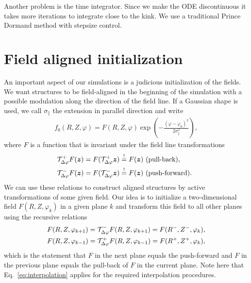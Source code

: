 Another problem is the time integrator. Since we make the ODE
discontinuous it takes more iterations to integrate close to the kink.
We use a traditional Prince Dormand method with stepsize control.
\section{Field aligned initialization} \label{sec:parallelc}

An important aspect of our simulations is a judicious initialization of the
fields. We want structures to be field-aligned in the beginning of the simulation with
a possible modulation along the direction of the field line.
If a Gaussian shape is used, we call $\sigma_\parallel$ the extension in parallel
direction and write
\begin{align}
    f_0(R,Z,\varphi) = F(R,Z,\varphi) \exp\left( - \frac{(\varphi-\varphi_0)^2}{2\sigma_\parallel^2}\right),
    \label{eq:parallelInit}
\end{align}
where $F$ is a function that is invariant under the field line transformations
\begin{subequations}
\begin{align}
    \mathcal T^+_{\Delta\varphi} F({\boldsymbol{z}}) &= F( \mathcal T^+_{\Delta\varphi} {\boldsymbol{z}}) \overset{!}{=} F({\boldsymbol{z}}) \text{ (pull-back), } \\
    \mathcal T^-_{\Delta\varphi} F({\boldsymbol{z}}) &= F( \mathcal T^-_{\Delta\varphi} {\boldsymbol{z}}) \overset{!}{=} F({\boldsymbol{z}}) \text{ (push-forward). } 
\end{align}
\label{}
\end{subequations}
We can use these relations to construct aligned structures
by active transformations of some given field.
Our idea is to initialize a two-dimensional field $F(R,Z, \varphi_k)$ in a given plane $k$ and
transform this field to all other planes using the recursive relations
\begin{subequations}
\begin{align}
    F( R, Z, \varphi_{k+1}) = \mathcal T^-_{\Delta\varphi} F( R, Z, \varphi_{k+1}) = F(R^-, Z^-, \varphi_k), \\
    F( R, Z, \varphi_{k-1}) = \mathcal T^+_{\Delta\varphi} F( R, Z, \varphi_{k-1}) = F(R^+, Z^+, \varphi_k),
\end{align}
    \label{eq:recursiveInit}
\end{subequations}
which is the statement that $F$ in the next plane equals the push-forward
and $F$ in the previous plane equals the pull-back of $F$ in the current plane.
Note here that Eq.~\eqref{eq:interpolation} applies for the required interpolation
procedures.



